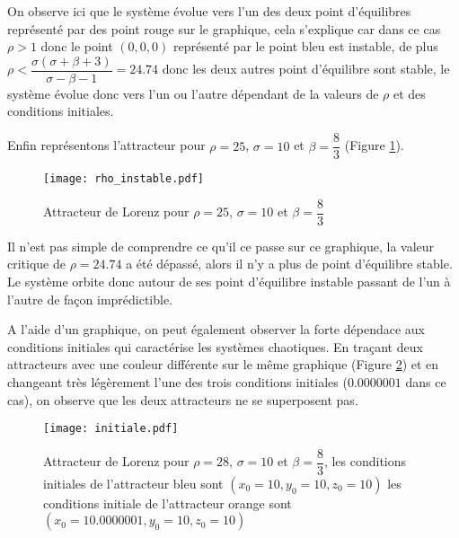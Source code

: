 On observe ici que le système évolue vers l'un des deux point d'équilibres représenté par des point rouge sur le graphique, cela s'explique car dans ce cas $\rho>1$ donc le point $(0,0,0)$ représenté par le point bleu est instable, de plus $\rho < \dfrac{\sigma(\sigma+\beta+3)}{\sigma-\beta-1}=24.74$ donc les deux autres point d'équilibre sont stable, le système évolue donc vers l'un ou l'autre dépendant de la valeurs de $\rho$ et des conditions initiales.  

Enfin représentons l'attracteur pour $\rho=25$, $\sigma=10$ et $\beta=\dfrac{8}{3}$ (Figure \ref{fig:rho_instable}).

\begin{figure}[!ht]
    \centering
    \texttt{[image: rho\_instable.pdf]}
    \caption{\label{fig:rho_instable}Attracteur de Lorenz pour $\rho=25$, $\sigma=10$ et $\beta=\dfrac{8}{3}$} 
\end{figure}

Il n'est pas simple de comprendre ce qu'il ce passe sur ce graphique, la valeur critique de $\rho=24.74$ a été dépassé, alors il n'y a plus de point d'équilibre stable. Le système orbite donc autour de ses point d'équilibre instable passant de l'un à l'autre de façon imprédictible.

A l'aide d'un graphique, on peut également observer la forte dépendace aux conditions initiales qui caractérise les systèmes chaotiques. En traçant deux attracteurs avec une couleur différente sur le même graphique (Figure \ref{fig:initiale}) et en changeant très légèrement l'une des trois conditions initiales ($0.0000001$ dans ce cas), on observe que les deux attracteurs ne se superposent pas.

\begin{figure}[!ht]
    \centering
    \texttt{[image: initiale.pdf]}
    \caption{\label{fig:initiale}Attracteur de Lorenz pour $\rho=28$, $\sigma=10$ et $\beta=\dfrac{8}{3}$, les conditions initiales de l'attracteur bleu sont $(x_0=10,y_0=10,z_0=10)$ les conditions initiale de l'attracteur orange sont $(x_0=10.0000001,y_0=10,z_0=10)$} 
\end{figure}


